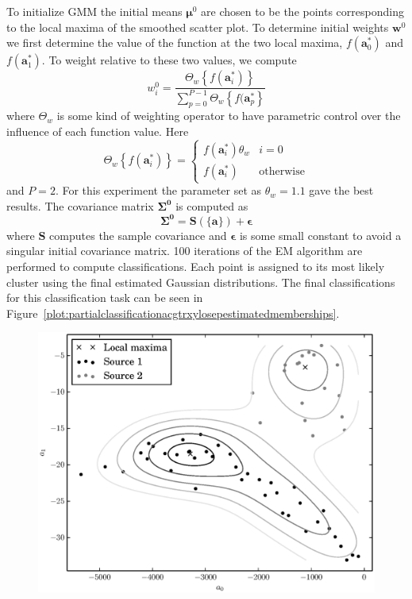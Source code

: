 To initialize GMM the initial means $\boldsymbol{\mu}^{0}$ are chosen to be the
points corresponding to the local maxima of the smoothed scatter plot. To
determine initial weights $\boldsymbol{w}^{0}$ we first determine the value of
the function at the two local maxima, $f(\boldsymbol{a}_{0}^{\ast})$ and
$f(\boldsymbol{a}_{1}^{\ast})$. To weight relative to these two values, we
compute
\[
    w_{i}^{0} = \frac{\Theta_{w} \left\{ f(\boldsymbol{a}_{i}^{\ast}) \right\}}{
    \sum_{p=0}^{P-1}\Theta_{w} \left\{ f(\boldsymbol{a}_{p}^{\ast} \right\}}
\]
where $\Theta_{w}$ is some kind of weighting operator to have parametric control
over the influence of each function value. Here
\[
    \Theta_{w} \left\{ f(\boldsymbol{a}_{i}^{\ast}) \right\}
    = \begin{cases}
        f(\boldsymbol{a}_{i}^{\ast}) \theta_{w} & i = 0 \\
        f(\boldsymbol{a}_{i}^{\ast}) & \text{otherwise}
    \end{cases}
\]
and $P = 2$. For this experiment the parameter set as $\theta_{w} = 1.1$ gave
the best results. The covariance matrix $\boldsymbol{\Sigma^{0}}$ is computed as
\[
    \boldsymbol{\Sigma^{0}} = \boldsymbol{S}(\{ \boldsymbol{a} \}) +
    \boldsymbol{\epsilon}
\]
where $\boldsymbol{S}$ computes the sample covariance and
$\boldsymbol{\epsilon}$ is some small constant to avoid a singular initial covariance
matrix. 100 iterations of the EM algorithm are performed to compute
classifications. Each point is assigned to its most likely cluster using the
final estimated Gaussian distributions. The final classifications for this
classification task can be seen in
Figure~\ref{plot:partialclassificationacgtrxylosepestimatedmemberships}.

\begin{figure}[!t]
    \centering
    \includegraphics[width=\figwidthscale\textwidth]{plots/partial_classification_acgtr_xylo_estimated_memberships.eps}
    \CaptionWithTitle{%
    }{\label{plot:partialclassificationacgtrxylosepestimatedmemberships}}
\end{figure}


